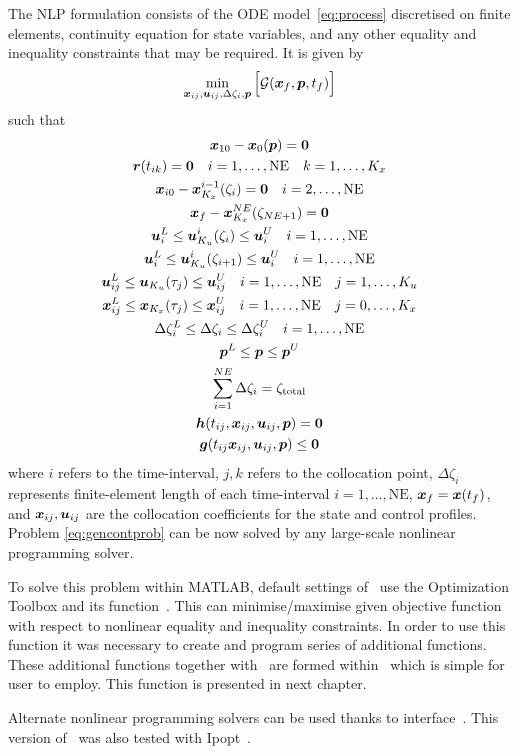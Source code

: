 The NLP formulation consists of the ODE model~\eqref{eq:process}
discretised on finite elements, continuity equation for state
variables, and any other equality and inequality constraints that may
be required. It is given by 
\begin{equation}
\min_{\ve{x}_{ij},\ve{u}_{ij},\Delta\zeta_{i},\ve{p}}\Big[\mf{G}(\ve{x}_{f},\ve{p},t_{f})\Big]
\label{eq:nlpform} 
\end{equation}
such that
\begin{gather*}
\ve{x}_{10}-\ve{x}_{0}(\ve{p}) = \ve{0}\\
\ve{r}(t_{ik}) = \ve{0} \quad i=1,\ldots,\textrm{NE} \quad k=1,\ldots,K_{x}\\
\ve{x}_{i0} - \ve{x}_{K_{x}}^{i-1}(\zeta_{i}) = \ve{0} \quad
i=2,\ldots,\textrm{NE}\\
\ve{x}_{f} - \ve{x}_{K_{x}}^{NE}(\zeta_{NE+1}) = \ve{0}\\ 
\ve{u}_{i}^{L} \leq \ve{u}_{K_{u}}^{i}(\zeta_{i}) \leq \ve{u}_{i}^{U} \quad
i=1,\ldots,\textrm{NE}\\ 
\ve{u}_{i}^{L} \leq \ve{u}_{K_{u}}^{i}(\zeta_{i+1}) \leq \ve{u}_{i}^{U}
\quad i=1,\ldots,\textrm{NE}\\
\ve{u}_{ij}^{L} \leq \ve{u}_{K_{u}}(\tau_{j}) \leq \ve{u}_{ij}^{U} \quad
i=1,\ldots,\textrm{NE} \quad j=1,\ldots,K_{u}\\
\ve{x}_{ij}^{L} \leq \ve{x}_{K_{x}}(\tau_{j}) \leq \ve{x}_{ij}^{U} \quad
i=1,\ldots,\textrm{NE} \quad j=0,\ldots,K_{x}\\
\Delta\zeta_{i}^{L}\leq\Delta\zeta_{i}\leq\Delta\zeta_{i}^{U} \quad
i=1,\ldots,\textrm{NE}\\
\ve{p}^{L} \leq \ve{p} \leq \ve{p}^{U}\\
\sum_{i=1}^{NE}\Delta\zeta_{i} = \zeta_{\textnormal{total}}\\
\ve{h}(t_{ij},\ve{x}_{ij},\ve{u}_{ij},\ve{p}) = \ve{0}\\
\ve{g}(t_{ij}\ve{x}_{ij},\ve{u}_{ij},\ve{p}) \leq \ve{0} 
\end{gather*} where $i$ refers to the time-interval, $j, k$ refers to
the collocation point, $\Delta\zeta_{i}$ represents finite-element
length of each time-interval $i=1,\ldots,\textrm{NE}$, $\ve{x}_{f} =
\ve{x}(t_{f})$, and $\ve{x}_{ij}, \ve{u}_{ij}$ are the collocation
coefficients for the state and control profiles. Problem
\eqref{eq:gencontprob} can be now solved by any large-scale nonlinear
programming solver.

To solve this problem within MATLAB, default settings of~
use the Optimization Toolbox and its function~. This can
minimise/maximise given objective function with respect to nonlinear
equality and inequality constraints. In order to use this function it
was necessary to create and program series of additional
functions. These additional functions together with~ are
formed within~ which is simple for user to employ. This
function is presented in next chapter.

Alternate nonlinear programming solvers can be used thanks to
interface~. This version of~ was also tested
with Ipopt~\citep{waech06}.



